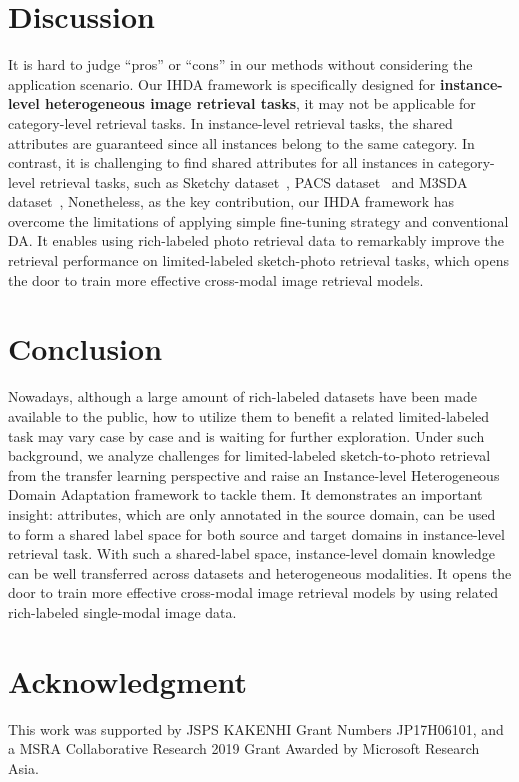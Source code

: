\documentclass[journal]{IEEEtran}
\begin{document}
\section{Discussion}
\label{sec:discusssion}


It is hard to judge ``pros'' or ``cons'' in our methods without considering the application scenario. 
Our IHDA framework is specifically designed for \textbf{instance-level heterogeneous image retrieval tasks}, it may not be applicable for category-level retrieval tasks. In instance-level retrieval tasks, the shared attributes are guaranteed since all instances belong to the same category. In contrast, it is challenging to find shared attributes for all instances in category-level retrieval tasks, such as Sketchy dataset~\cite{sangkloy2016sketchy}, PACS dataset~\cite{Li2017dg} and M3SDA dataset~\cite{peng2019moment},
Nonetheless, as the key contribution, our IHDA framework has overcome the limitations of applying simple fine-tuning strategy and conventional DA. It enables using rich-labeled photo retrieval data to remarkably improve the retrieval performance on limited-labeled sketch-photo retrieval tasks, which opens the door to train more effective cross-modal image retrieval models.



\section{Conclusion}
\label{sec:conclusion}

Nowadays, although a large amount of rich-labeled datasets have been made available to the public, how to utilize them to benefit a related limited-labeled task may vary case by case and is waiting for further exploration. Under such background, we analyze challenges for limited-labeled sketch-to-photo retrieval from the transfer learning perspective and raise an Instance-level Heterogeneous Domain Adaptation framework to tackle them. It demonstrates an important insight: attributes, which are only annotated in the source domain, can be used to form a shared label space for both source and target domains in instance-level retrieval task. With such a shared-label space, instance-level domain knowledge can be well transferred across datasets and heterogeneous modalities. It opens the door to train more effective cross-modal image retrieval models by using related rich-labeled single-modal image data.


\section*{Acknowledgment}
This work was supported by JSPS KAKENHI Grant Numbers JP17H06101, and a MSRA Collaborative Research 2019 Grant Awarded by Microsoft Research Asia.




\ifCLASSOPTIONcaptionsoff
  \newpage
\fi




\end{document}

